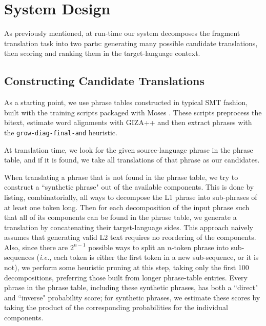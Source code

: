 \documentclass[11pt,a4paper]{article}
\begin{document}

\section{System Design}
\label{sec:system}

As previously mentioned, at run-time our system decomposes the fragment
translation task into two parts: generating many possible candidate
translations, then scoring and ranking them in the target-language context.

\subsection{Constructing Candidate Translations}
\label{sec:candidates}

As a starting point, we use phrase tables constructed in typical SMT fashion,
built with the training scripts packaged with Moses \cite{koehn:hoang:ea:07}.
These scripts preprocess the bitext, estimate word alignments with GIZA++
\cite{och:ney:00} and then extract phrases with the
\texttt{grow-diag-final-and} heuristic. 

At translation time, we look for the given source-language phrase in the phrase
table, and if it is found, we take all translations of that phrase as our
candidates.

When translating a phrase that is not found in the
phrase table, we try to construct a ``synthetic phrase" out of the available
components. This is done by listing, combinatorially, all ways to decompose the
L1 phrase into sub-phrases of at least one token long. Then for each
decomposition of the input phrase such that all of its components can be found
in the phrase table, we generate a translation by concatenating their
target-language sides. This approach naively assumes that generating valid L2
text requires no reordering of the components. Also, since there are $2^{n-1}$
possible ways to split an $n$-token phrase into sub-sequences (\textit{i.e.},
each token is either the first token in a new sub-sequence, or it is not), we
perform some heuristic pruning at this step, taking only the first 100
decompositions, preferring those built from longer phrase-table entries. Every
phrase in the phrase table, including these synthetic phrases, has both a
``direct" and ``inverse" probability score; for synthetic phrases, we estimate
these scores by taking the product of the corresponding probabilities for the
individual components.
\end{document}
